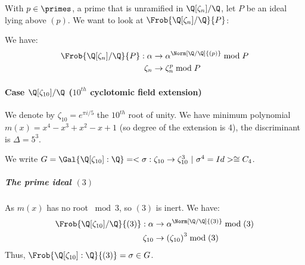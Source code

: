 With $p \in \primes$, a prime that is unramified in $\Q[\zeta_n]/\Q$, let $P$ be an ideal lying above $(p)$.
We want to look at $\Frob{\Q[\zeta_n]/\Q}{P}$:

We have:
\begin{align*}
	\Frob{\Q[\zeta_n]/\Q}{P}: 
	\alpha&\to \alpha^{\Norm[\Q/\Q]{(p)}} \bmod P\\
	\zeta_n&\to \zeta_n^p \bmod P
\end{align*}

\paragraph{Case $\Q[\zeta_{10}]/\Q$ ($10^{th}$ cyclotomic field extension)}
We denote by $\zeta_{10}=e^{\pi i/5}$ the $10^{th}$ root of unity.
We have minimum polynomial $m(x) = x^4-x^3+x^2-x+1$ (so degree of the extension is 4), the discriminant is $\Delta = 5^3$.

We write $
G = \Gal{\Q[\zeta_{10}]:\Q} 
= < \sigma: \zeta_{10} \to \zeta_{10}^3 \ | \ \sigma^4 = Id > \cong C_4$.



\subparagraph{The prime ideal $(3)$}
As $m(x)$ has no root $\bmod 3$, so $(3)$ is inert.
We have:
\begin{align*}
	\Frob{\Q[\zeta_{10}]/\Q}{(3)}:
	\alpha   &\to \alpha^{\Norm[\Q/\Q]{(3)}} \bmod (3)\\
	\zeta_{10} &\to \left( \zeta_{10} \right)^3 \bmod (3)
\end{align*}
Thus, $\Frob{\Q[\zeta_{10}]:\Q}{(3)} = \sigma \in G$.

